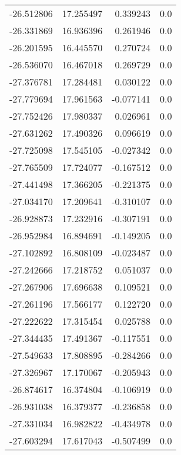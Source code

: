 \begin{tabular}{rrrr}
      -26.512806 &        17.255497 &    0.339243 &   0.0 \\
      -26.331869 &        16.936396 &    0.261946 &   0.0 \\
      -26.201595 &        16.445570 &    0.270724 &   0.0 \\
      -26.536070 &        16.467018 &    0.269729 &   0.0 \\
      -27.376781 &        17.284481 &    0.030122 &   0.0 \\
      -27.779694 &        17.961563 &   -0.077141 &   0.0 \\
      -27.752426 &        17.980337 &    0.026961 &   0.0 \\
      -27.631262 &        17.490326 &    0.096619 &   0.0 \\
      -27.725098 &        17.545105 &   -0.027342 &   0.0 \\
      -27.765509 &        17.724077 &   -0.167512 &   0.0 \\
      -27.441498 &        17.366205 &   -0.221375 &   0.0 \\
      -27.034170 &        17.209641 &   -0.310107 &   0.0 \\
      -26.928873 &        17.232916 &   -0.307191 &   0.0 \\
      -26.952984 &        16.894691 &   -0.149205 &   0.0 \\
      -27.102892 &        16.808109 &   -0.023487 &   0.0 \\
      -27.242666 &        17.218752 &    0.051037 &   0.0 \\
      -27.267906 &        17.696638 &    0.109521 &   0.0 \\
      -27.261196 &        17.566177 &    0.122720 &   0.0 \\
      -27.222622 &        17.315454 &    0.025788 &   0.0 \\
      -27.344435 &        17.491367 &   -0.117551 &   0.0 \\
      -27.549633 &        17.808895 &   -0.284266 &   0.0 \\
      -27.326967 &        17.170067 &   -0.205943 &   0.0 \\
      -26.874617 &        16.374804 &   -0.106919 &   0.0 \\
      -26.931038 &        16.379377 &   -0.236858 &   0.0 \\
      -27.331034 &        16.982822 &   -0.434978 &   0.0 \\
      -27.603294 &        17.617043 &   -0.507499 &   0.0 \\

\end{tabular}
